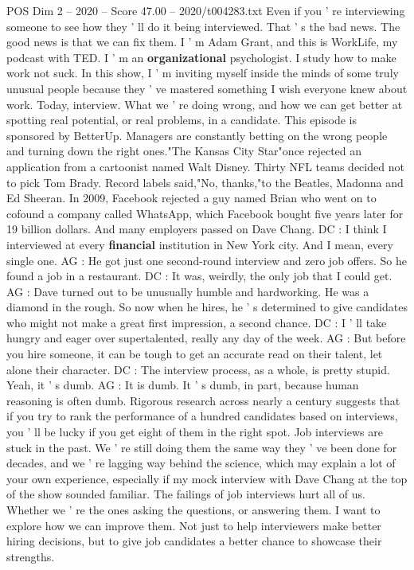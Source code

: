 \begin{textsample}{POS Dim 2 – 2020 – Score 47.00 – 2020/t004283.txt}
Even if you ' re interviewing someone to see how they ' ll do it being interviewed.
That ' s the bad news.
The good news is that we can fix them.
I ' m Adam Grant, and this is WorkLife, my podcast with TED.
I ' m an \textbf{organizational} psychologist.
I study how to make work not suck.
In this show, I ' m inviting myself inside the minds of some truly unusual people because they ' ve mastered something I wish everyone knew about work.
Today, interview.
What we ' re doing wrong, and how we can get better at spotting real potential, or real problems, in a candidate.
This episode is sponsored by BetterUp.
Managers are constantly betting on the wrong people and turning down the right ones."The Kansas City Star"once rejected an application from a cartoonist named Walt Disney.
Thirty NFL teams decided not to pick Tom Brady.
Record labels said,"No, thanks,"to the Beatles, Madonna and Ed Sheeran.
In 2009, Facebook rejected a guy named Brian who went on to cofound a company called WhatsApp, which Facebook bought five years later for 19 billion dollars.
And many employers passed on Dave Chang.
DC : I think I interviewed at every \textbf{financial} institution in New York city.
And I mean, every single one.
AG : He got just one second-round interview and zero job offers.
So he found a job in a restaurant.
DC : It was, weirdly, the only job that I could get.
AG : Dave turned out to be unusually humble and hardworking.
He was a diamond in the rough.
So now when he hires, he ' s determined to give candidates who might not make a great first impression, a second chance.
DC : I ' ll take hungry and eager over supertalented, really any day of the week.
AG : But before you hire someone, it can be tough to get an accurate read on their talent, let alone their character.
DC : The interview process, as a whole, is pretty stupid.
Yeah, it ' s dumb.
AG : It is dumb.
It ' s dumb, in part, because human reasoning is often dumb.
Rigorous research across nearly a century suggests that if you try to rank the performance of a hundred candidates based on interviews, you ' ll be lucky if you get eight of them in the right spot.
Job interviews are stuck in the past.
We ' re still doing them the same way they ' ve been done for decades, and we ' re lagging way behind the science, which may explain a lot of your own experience, especially if my mock interview with Dave Chang at the top of the show sounded familiar.
The failings of job interviews hurt all of us.
Whether we ' re the ones asking the questions, or answering them.
I want to explore how we can improve them.
Not just to help interviewers make better hiring decisions, but to give job candidates a better chance to showcase their strengths.

\end{textsample}
